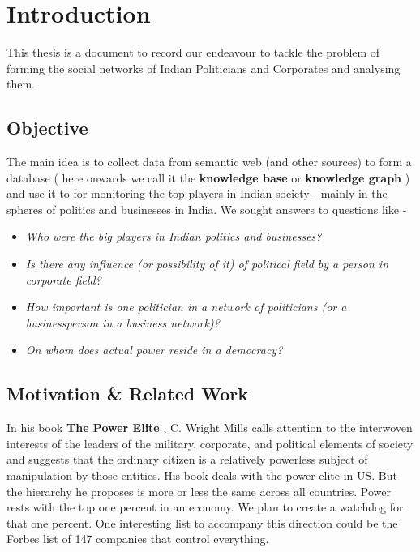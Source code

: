 \chapter{Introduction}


This thesis is a document to record our endeavour to tackle the problem of forming the social networks of Indian Politicians and Corporates and analysing them.

\section{Objective}

The main idea is to collect data from semantic web (and other sources) to form a database ( here onwards we call it the \textbf{knowledge base} or \textbf{knowledge graph} )  and use it to for monitoring the top players in Indian society - mainly in the spheres of politics and businesses in India. We sought answers to questions like - 
\begin{itemize}
    \item \emph{Who were the big players in Indian politics and businesses?}
    \item \emph{Is there any influence (or possibility of it) of political field by a person in corporate field?}
    \item \emph{How important is one politician in a network of politicians (or a businessperson in a business network)?}
    \item \emph{On whom does actual power reside in a democracy?}
\end{itemize}

\section{Motivation \& Related Work}

In his book \textbf{The Power Elite} \cite{Mills}, C. Wright Mills calls attention to the interwoven interests of the leaders of the military, corporate, and political elements of society and suggests that the ordinary citizen is a relatively powerless subject of manipulation by those entities. His book deals with the power elite in US. But the hierarchy he proposes is more or less the same across all countries. Power rests with the top one percent in an economy. We plan to create a watchdog for that one percent. One interesting list to accompany this direction could be the Forbes list \cite{FORBES} of 147 companies that control everything. 

